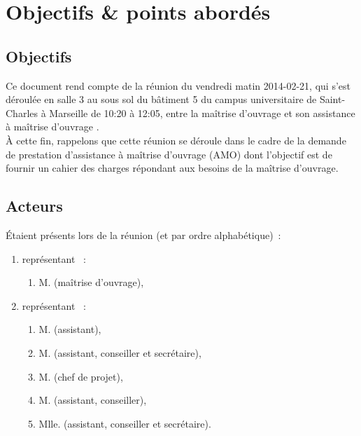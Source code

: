 \documentclass[11pt,fleqn]{report}
\begin{document}
\ZMakeCover


\chapter{Objectifs \& points abordés}

\section{Objectifs}
Ce document rend compte de la réunion du vendredi matin 2014-02-21, qui s'est déroulée en salle 3 au sous sol du bâtiment 5 du campus universitaire de Saint-Charles à Marseille de 10:20 à 12:05, entre la maîtrise d'ouvrage \mo et son assistance à maîtrise d'ouvrage \amo.
\\
À cette fin, rappelons que cette réunion se déroule dans le cadre de la demande de prestation d'assistance à maîtrise d'ouvrage (AMO) dont l'objectif est de fournir un cahier des charges répondant aux besoins de la maîtrise d'ouvrage.

\section{Acteurs}
Étaient présents lors de la réunion (et par ordre alphabétique)~:
\begin{enumerate}
	\item représentant \mo~:
	\begin{enumerate}
		\item M. \Agopian (maîtrise d'ouvrage),
	\end{enumerate}
	\item représentant \amo~:
	\begin{enumerate}
		\item M. \Balde (assistant),
		\item M. \Cadon (assistant, conseiller et secrétaire),
		\item M. \Gairoard (chef de projet),
		\item M. \Pachy (assistant, conseiller),
		\item Mlle. \Toure (assistant, conseiller et secrétaire).
	\end{enumerate}
\end{enumerate}
\end{document}
